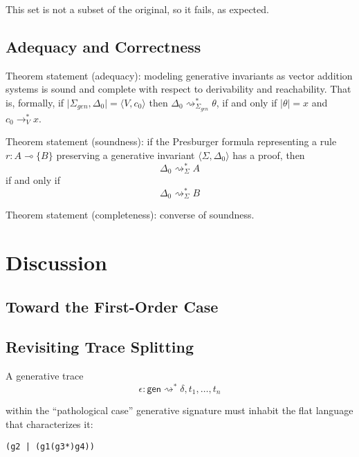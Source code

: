 \documentclass[fullpage, 11pt]{article}
\newcommand{\lolli}{\multimap}
\newcommand{\mon}[1]{\{#1\}}
\newcommand{\stepsto}{\rightsquigarrow}
\begin{document}
This set is not a subset of the original, so it fails, as expected.


\subsection{Adequacy and Correctness}

Theorem statement (adequacy): modeling generative invariants as vector
addition systems is sound and complete with respect to derivability and
reachability. That is, formally,
  if $\mid \Sigma_{gen}, \Delta_0 \mid = \langle V, c_0\rangle$
  then
  $\Delta_0 \stepsto^*_{\Sigma_{gen}} \theta$, 
  if and only if
  $\mid \theta \mid = x$ and $c_0 \to^*_{V} x$.


Theorem statement (soundness): if the Presburger formula representing a
rule $r : A \lolli \mon{B}$ 
preserving a generative invariant $\langle \Sigma, \Delta_0 \rangle$ 
has a proof, then 
\[
\Delta_0 \stepsto^*_{\Sigma} A 
\] 
if and only if 
\[
\Delta_0 \stepsto^*_{\Sigma} B 
\]

Theorem statement (completeness): converse of soundness.



\section{Discussion}
\label{sec:conc}

\subsection{Toward the First-Order Case}

\subsection{Revisiting Trace Splitting}

A generative trace
\[
\epsilon : \mathsf{gen} \stepsto^* \delta, t_1, \dots, t_n
\]

within the ``pathological case'' generative signature must inhabit the
flat language that characterizes it:

\begin{verbatim}
(g2 | (g1(g3*)g4))
\end{verbatim}
\end{document}
